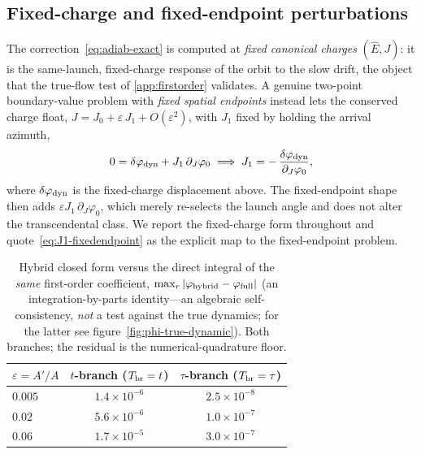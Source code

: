 \documentclass[12pt]{iopart}
\theoremstyle{plain}
\theoremstyle{definition}
\theoremstyle{remark}
\newcommand{\Ehat}{\hat E}
\begin{document}
\subsection{Fixed-charge and fixed-endpoint perturbations}
The correction~\eqref{eq:adiab-exact}
is computed at \emph{fixed canonical charges} $(\Ehat,J)$: it is the same-launch,
fixed-charge response of the orbit to the slow drift, the object that the true-flow
test of \ref{app:firstorder} validates. A genuine two-point boundary-value
problem with \emph{fixed spatial endpoints} instead lets the conserved charge float,
$J=J_0+\varepsilon\,J_1+O(\varepsilon^2)$, with $J_1$ fixed by holding the arrival
azimuth,
\begin{equation}
    0=\delta\varphi_{\rm dyn}+J_1\,\partial_J\varphi_0
    \;\Longrightarrow\;
    J_1=-\,\frac{\delta\varphi_{\rm dyn}}{\partial_J\varphi_0},
    \label{eq:J1-fixedendpoint}
\end{equation}
where $\delta\varphi_{\rm dyn}$ is the fixed-charge displacement above. The
fixed-endpoint shape then adds $\varepsilon J_1\,\partial_J\varphi_0$, which merely
re-selects the launch angle and does not alter the transcendental class. We report
the fixed-charge form throughout and quote~\eqref{eq:J1-fixedendpoint} as the explicit
map to the fixed-endpoint problem.

\begin{table}[htbp]
    \centering
    \caption{Hybrid closed form versus the direct integral of the \emph{same}
    first-order coefficient, $\max_r|\varphi_{\rm hybrid}-\varphi_{\rm full}|$ (an
    integration-by-parts identity---an algebraic self-consistency, \emph{not} a test
    against the true dynamics; for the latter see figure~\ref{fig:phi-true-dynamic}).
    Both branches; the residual is the numerical-quadrature floor.}
    \label{tab:adiab-valid}
    \begin{tabular}{lcc}
        \hline\hline
        $\varepsilon=A'/A$ & $t$-branch ($T_{\rm br}=t$) & $\tau$-branch ($T_{\rm br}=\tau$)\\
        \hline
        $0.005$ & $1.4\times10^{-6}$ & $2.5\times10^{-8}$\\
        $0.02$  & $5.6\times10^{-6}$ & $1.0\times10^{-7}$\\
        $0.06$  & $1.7\times10^{-5}$ & $3.0\times10^{-7}$\\
        \hline\hline
    \end{tabular}
\end{table}
\end{document}
